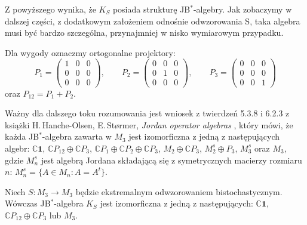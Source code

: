 {Z powyższego wynika, że $K_{S}$ posiada strukturę JB$^{*}$-algebry.
Jak zobaczymy w dalszej części,
z dodatkowym założeniem odnośnie odwzorowania S,
taka algebra musi być bardzo szczególna,
przynajmniej w nisko wymiarowym przypadku.

Dla wygody oznaczmy ortogonalne projektory:
\begin{equation}
\label{def:OrthogonalProjections}
    P_{1} = \begin{pmatrix}
        1 & 0 & 0 \\
        0 & 0 & 0 \\
        0 & 0 & 0
    \end{pmatrix} , \quad \quad
    P_{2} = \begin{pmatrix}
        0 & 0 & 0 \\
        0 & 1 & 0 \\
        0 & 0 & 0
    \end{pmatrix} , \quad \quad
    P_{3} = \begin{pmatrix}
        0 & 0 & 0 \\
        0 & 0 & 0 \\
        0 & 0 & 1
    \end{pmatrix}
\end{equation}
oraz $P_{12} = P_{1} + P_{2}$.

\label{page:allpossibleJalg}
Ważny dla dalszego toku rozumowania jest wniosek z twierdzeń 5.3.8 i 6.2.3
z książki
H.\,Hanche-Olsen, E.\,St{\o}rmer,
\emph{Jordan operator algebras} \cite{Hanche1984},
który mówi, że każda JB$^{*}$-algebra zawarta w $M_{3}$
jest izomorficzna z jedną z następujących algebr:
$\mathbb{C}\mathbf{1}$,
$\mathbb{C} P_{12} \oplus \mathbb{C} P_{3}$,
$\mathbb{C} P_{1} \oplus \mathbb{C} P_{2} \oplus \mathbb{C} P_{3}$,
$M_{2} \oplus \mathbb{C} P_{3}$,
$M_{2}^{s} \oplus P_{3}$,
$M_{3}^{s}$ oraz $M_{3}$,
gdzie $M_{n}^{s}$ jest algebrą Jordana składającą się z symetrycznych
macierzy rozmiaru $n$: $M_{n}^{s} = \{ A \in M_{n}: A = A^{t} \}$.

\begin{Theorem}
\label{thm:ExposedMaps}
Niech $S\!: M_{3} \rightarrow M_{3}$ będzie ekstremalnym odwzorowaniem
bistochastycznym.
Wówczas JB$^{*}$-algebra $K_{S}$ jest izomorficzna z jedną z następujących:
$\mathbb{C}\mathbf{1}$, $\mathbb{C} P_{12} \oplus \mathbb{C} P_{3}$
lub
$M_{3}$.
\end{Theorem}

}
